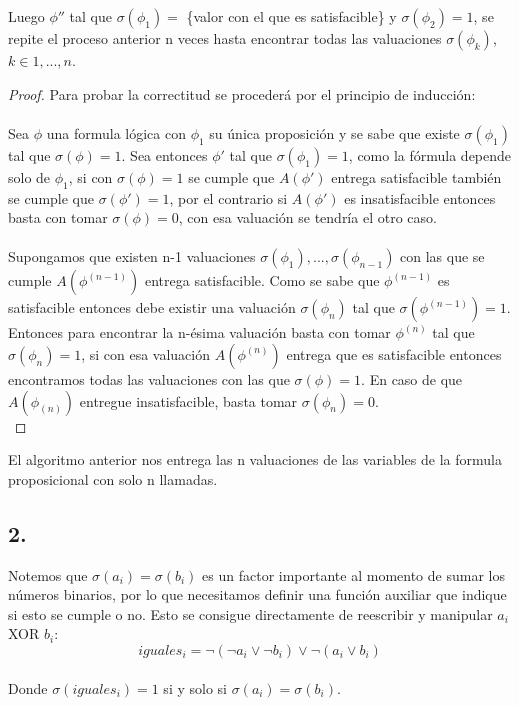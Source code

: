 \documentclass[
	spanish, %
	letterpaper, oneside
]{article}
\begin{document}
Luego $\phi''$ tal que $\sigma(\phi_1) =$ \{valor con el que es satisfacible\} y $\sigma(\phi_2)=1$, se repite el proceso anterior n veces hasta encontrar todas las valuaciones $\sigma (\phi_k)$, $k\in {1,...,n}$.\\
\begin{proof}
	Para probar la correctitud se procederá por el principio de inducción:\\
	\\
Sea $\phi$ una formula lógica con $\phi_{1}$ su única proposición y se sabe que existe $\sigma(\phi_1) $ tal que $\sigma(\phi) = 1$. Sea entonces $\phi'$ tal que $\sigma(\phi_1) = 1$, como la fórmula depende solo de $\phi_1$, si con $\sigma(\phi) = 1$ se cumple que $A(\phi')$ entrega satisfacible también se cumple que $\sigma(\phi')=1$, por el contrario si $A(\phi')$ es insatisfacible entonces basta con tomar $\sigma(\phi) = 0$, con esa valuación se tendría el otro caso.\\
	\\
Supongamos que existen n-1 valuaciones ${\sigma(\phi_1),...,\sigma(\phi_{n-1})}$ con las que se cumple $A(\phi^{(n-1)})$ entrega satisfacible. Como se sabe que $\phi^{(n-1)}$ es satisfacible entonces debe existir una valuación $\sigma(\phi_n)$ tal que $\sigma(\phi^{(n-1)})=1$. Entonces para encontrar la n-ésima valuación basta con tomar $\phi^{(n)}$ tal que $\sigma(\phi_n)=1$, si con esa valuación $A(\phi^{(n)})$ entrega que es satisfacible entonces encontramos todas las valuaciones con las que $\sigma(\phi)=1$. En caso de que $A(\phi_{(n)})$ entregue insatisfacible, basta tomar $\sigma(\phi_n)=0$.\\
\end{proof}
El algoritmo anterior nos entrega las n valuaciones de las variables de la formula proposicional con solo n llamadas.\\
\newpage

\subsection*{2.}
Notemos que $\sigma(a_i) = \sigma(b_i)$ es un factor importante al momento de sumar los números binarios, por lo que necesitamos definir una función auxiliar que indique si esto se cumple o no. Esto se consigue directamente de reescribir y manipular $a_i$ XOR $b_i$:\\
$$iguales_i = \neg(\neg a_i \vee \neg b_i) \vee \neg(a_i\vee b_i) $$\\
Donde $\sigma(iguales_i) = 1$ si y solo si $\sigma(a_i) = \sigma(b_i)$.\\
\end{document}
